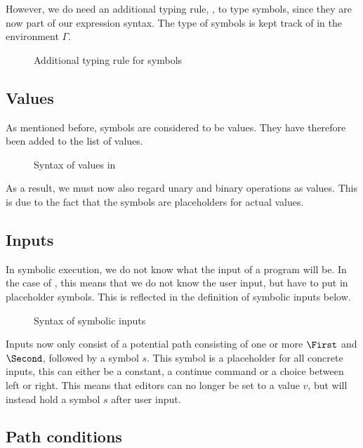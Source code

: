 However, we do need an additional typing rule, , to type symbols,
since they are now part of our expression syntax.
The type of symbols is kept track of in the environment $\Gamma$.

\begin{figure}
  \caption{Additional typing rule for symbols}
  \label{fig:typingsymbol}
\end{figure}

\subsection{Values}

As mentioned before, symbols are considered to be values.
They have therefore been added to the list of values.

\begin{figure}
\caption{Syntax of values in \TOPHAT}
  \label{fig:syntaxvalues}
\end{figure}

As a result, we must now also regard unary and binary operations as values.
This is due to the fact that the symbols are placeholders for actual values.


\subsection{Inputs}

In symbolic execution, we do not know what the input of a program will be.
In the case of \TOPHAT, this means that we do not know the user input, but have to put in placeholder symbols.
This is reflected in the definition of symbolic inputs below.

\begin{figure}
  \caption{Syntax of symbolic inputs}
  \label{fig:syntaxinputs}
\end{figure}

Inputs now only consist of a potential path consisting of one or more $\First$ and $\Second$,
followed by a symbol $s$.
This symbol is a placeholder for all concrete inputs, this can either be a constant, a continue command or a choice between left or right.
This means that editors can no longer be set to a value $v$, but will instead hold a symbol $s$ after user input.


\subsection{Path conditions}

